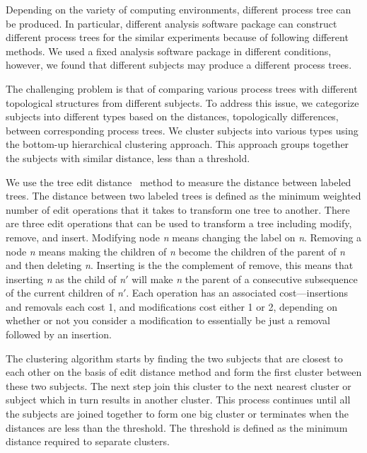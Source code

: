 \documentclass[a4paper,num-refs]{oup-contemporary}
\begin{document}
Depending on the variety of computing environments, different  
process tree can be produced. In particular, different analysis 
software package can construct different process trees for the 
similar experiments because of following different methods. We used a 
fixed analysis software package in different conditions, however, we 
found that different subjects may produce a different process trees. 

The challenging problem is that of comparing various process trees with 
different topological structures from different subjects. To address 
this issue, we categorize subjects into different types based on the 
distances, topologically differences, between corresponding process 
trees. 
We cluster subjects into various types using the bottom-up 
hierarchical clustering approach. This approach groups together the 
subjects with similar distance, less than a threshold. 

We use the tree edit distance~\cite{zhang1989simple} method to measure 
the distance between labeled trees. The distance between two labeled 
trees is defined as the minimum weighted number of edit operations that 
it takes to transform one tree to another. There are three edit 
operations that can be used to transform a tree including modify, 
remove, and insert. Modifying node \textit{n} means changing the label 
on \textit{n}. Removing a node \textit{n} means making the children of 
\textit{n} become the children of the parent of \textit{n} and then 
deleting \textit{n}. Inserting is the the complement of remove, this 
means that inserting \textit{n} as the child of \textit{n}$'$ will make 
\textit{n} the parent of a consecutive subsequence of the current 
children of \textit{n}$'$.
Each operation has an associated cost---insertions and removals each 
cost 1, and modifications cost either 1 or 2, depending on whether or 
not you consider a modification to essentially be just a removal 
followed by an insertion.

The clustering algorithm starts by finding the two subjects that are 
closest to each other on the basis of edit distance method and form the 
first cluster between these two subjects. The next step join this 
cluster to the next nearest cluster or subject which in turn results in 
another cluster. This process continues until all the subjects are 
joined together to form one big cluster or terminates when the distances 
are less than the threshold. The threshold is defined as the minimum 
distance required to separate clusters. 
\end{document}
